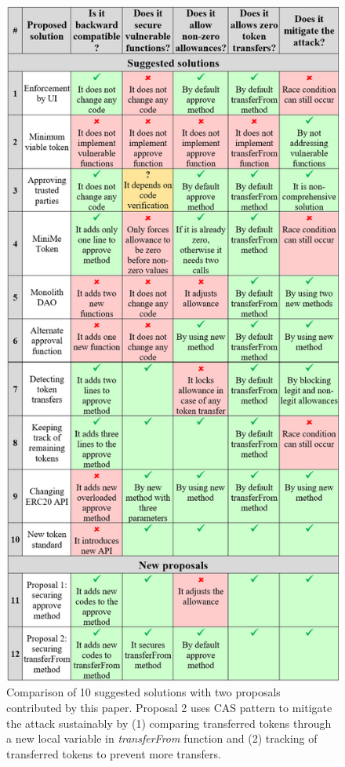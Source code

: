 \begin{figure}[H]
	\centering
	\includegraphics[width=1.0\linewidth]{figures/multiple_withdrawal_04.png}
	\caption{Comparison of 10 suggested solutions with two proposals contributed by this paper. Proposal 2 uses CAS pattern to mitigate the attack sustainably by (1) comparing transferred tokens through a new local variable in \textit{transferFrom} function and (2) tracking of transferred tokens to prevent more transfers.}
\end{figure}